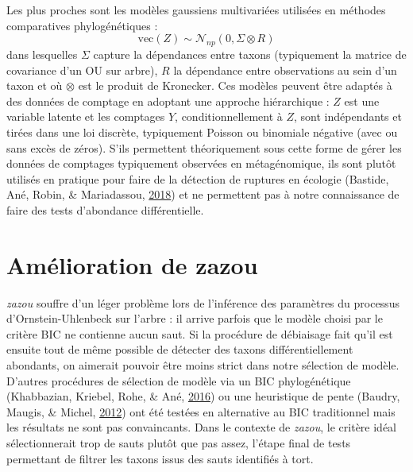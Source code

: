 \documentclass[12pt,a4paper]{reedthesis}
\theoremstyle{definition}
\theoremstyle{definition}
\theoremstyle{definition}
\theoremstyle{remark}
\begin{document}
Les plus proches sont les modèles gaussiens multivariées utilisées en méthodes comparatives phylogénétiques :
\begin{equation*}
\text{vec}(Z) \sim \mathcal{N}_{np}\left(0, \Sigma \otimes R\right)
\end{equation*}
dans lesquelles \(\Sigma\) capture la dépendances entre taxons (typiquement la matrice de covariance d'un OU sur arbre), \(R\) la dépendance entre observations au sein d'un taxon et où \(\otimes\) est le produit de Kronecker. Ces modèles peuvent être adaptés à des données de comptage en adoptant une approche hiérarchique : \(Z\) est une variable latente et les comptages \(Y\), conditionnellement à \(Z\), sont indépendants et tirées dans une loi discrète, typiquement Poisson ou binomiale négative (avec ou sans excès de zéros). S'ils permettent théoriquement sous cette forme de gérer les données de comptages typiquement observées en métagénomique, ils sont plutôt utilisés en pratique pour faire de la détection de ruptures en écologie (Bastide, Ané, Robin, \& Mariadassou, \protect\hyperlink{ref-bastide2018inference}{2018}) et ne permettent pas à notre connaissance de faire des tests d'abondance différentielle.

\hypertarget{amuxe9lioration-de-zazou}{%
\section*{Amélioration de zazou}\label{amuxe9lioration-de-zazou}}

\emph{zazou} souffre d'un léger problème lors de l'inférence des paramètres du processus d'Ornstein-Uhlenbeck sur l'arbre : il arrive parfois que le modèle choisi par le critère BIC ne contienne aucun saut. Si la procédure de débiaisage fait qu'il est ensuite tout de même possible de détecter des taxons différentiellement abondants, on aimerait pouvoir être moins strict dans notre sélection de modèle. D'autres procédures de sélection de modèle via un BIC phylogénétique (Khabbazian, Kriebel, Rohe, \& Ané, \protect\hyperlink{ref-khabbazian2016fast}{2016}) ou une heuristique de pente (Baudry, Maugis, \& Michel, \protect\hyperlink{ref-baudry2012slope}{2012}) ont été testées en alternative au BIC traditionnel mais les résultats ne sont pas convaincants. Dans le contexte de \emph{zazou}, le critère idéal sélectionnerait trop de sauts plutôt que pas assez, l'étape final de tests permettant de filtrer les taxons issus des sauts identifiés à tort.
\end{document}
